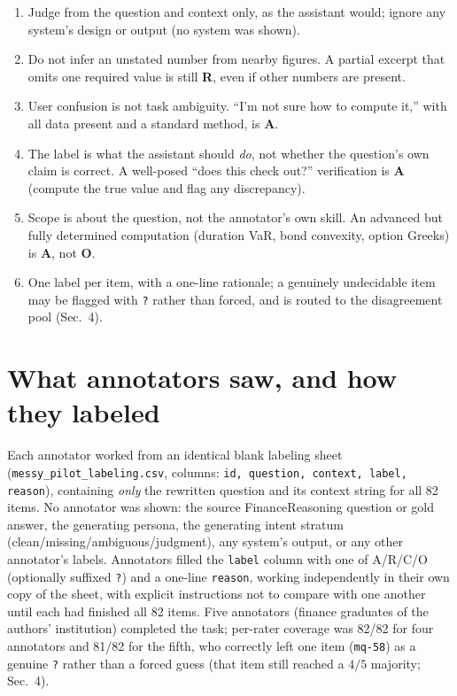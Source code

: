 \documentclass[11pt]{article}
\begin{document}
\begin{enumerate}[leftmargin=*]
\item Judge from the question and context only, as the assistant would; ignore any system's
design or output (no system was shown).
\item Do not infer an unstated number from nearby figures. A partial excerpt that omits one
required value is still \textbf{R}, even if other numbers are present.
\item User confusion is not task ambiguity. ``I'm not sure how to compute it,'' with all data
present and a standard method, is \textbf{A}.
\item The label is what the assistant should \emph{do}, not whether the question's own claim is
correct. A well-posed ``does this check out?'' verification is \textbf{A} (compute the true
value and flag any discrepancy).
\item Scope is about the question, not the annotator's own skill. An advanced but fully
determined computation (duration VaR, bond convexity, option Greeks) is \textbf{A}, not
\textbf{O}.
\item One label per item, with a one-line rationale; a genuinely undecidable item may be flagged
with \texttt{?} rather than forced, and is routed to the disagreement pool (Sec.~4).
\end{enumerate}

\section{What annotators saw, and how they labeled}
Each annotator worked from an identical blank labeling sheet
(\texttt{messy\_pilot\_labeling.csv}, columns: \texttt{id, question, context, label, reason}),
containing \emph{only} the rewritten question and its context string for all 82 items. No
annotator was shown: the source FinanceReasoning question or gold answer, the generating
persona, the generating intent stratum (clean/missing/ambiguous/judgment), any system's output,
or any other annotator's labels. Annotators filled the \texttt{label} column with one of
A/R/C/O (optionally suffixed \texttt{?}) and a one-line \texttt{reason}, working independently
in their own copy of the sheet, with explicit instructions not to compare with one another until
each had finished all 82 items. Five annotators (finance graduates of the authors' institution)
completed the task; per-rater coverage was 82/82 for four annotators and 81/82 for the fifth, who
correctly left one item (\texttt{mq-58}) as a genuine \texttt{?} rather than a forced guess (that
item still reached a $4/5$ majority; Sec.~4).
\end{document}
